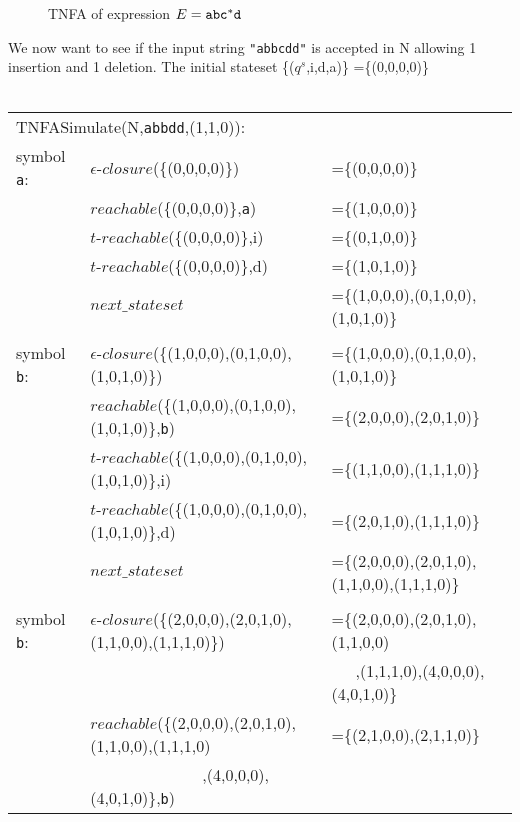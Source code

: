 \begin{myex}
\begin{figure}[h!]
\begin{center}
\end{center}
\caption{TNFA of expression $E = {\tt abc}^*{\tt d}$}
\label{tnfa:simsuc}
\end{figure}
We now want to see if the input string {\tt "abbcdd"} is accepted in N allowing 1 insertion and 1 deletion. The initial stateset \{($q^s$,i,d,a)\} =\{(0,0,0,0)\}\\\\
\begin{table}[h!]
\small
\begin{tabular}{l l l}
\multicolumn{2}{l}{TNFASimulate(N,{\tt abbdd},(1,1,0)):}\\
symbol {\tt a}:& $\epsilon$-$closure$(\{(0,0,0,0)\})&=\{(0,0,0,0)\}\\
&$reachable$(\{(0,0,0,0)\},{\tt a})&=\{(1,0,0,0)\}\\
&$t$-$reachable$(\{(0,0,0,0)\},i)&=\{(0,1,0,0)\}\\
&$t$-$reachable$(\{(0,0,0,0)\},d)&=\{(1,0,1,0)\}\\
&$next\_stateset$&=\{(1,0,0,0),(0,1,0,0),(1,0,1,0)\}\\
\\
symbol {\tt b}:& $\epsilon$-$closure$(\{(1,0,0,0),(0,1,0,0),(1,0,1,0)\}) &=\{(1,0,0,0),(0,1,0,0),(1,0,1,0)\}\\
&$reachable$(\{(1,0,0,0),(0,1,0,0),(1,0,1,0)\},{\tt b})&=\{(2,0,0,0),(2,0,1,0)\}\\
&$t$-$reachable$(\{(1,0,0,0),(0,1,0,0),(1,0,1,0)\},i)&=\{(1,1,0,0),(1,1,1,0)\}\\
&$t$-$reachable$(\{(1,0,0,0),(0,1,0,0),(1,0,1,0)\},d)&=\{(2,0,1,0),(1,1,1,0)\}\\
&$next\_stateset$&=\{(2,0,0,0),(2,0,1,0),(1,1,0,0),(1,1,1,0)\}\\
\\ 
symbol {\tt b}:&$\epsilon$-$closure$(\{(2,0,0,0),(2,0,1,0),(1,1,0,0),(1,1,1,0)\})&=\{(2,0,0,0),(2,0,1,0),(1,1,0,0)\\
&&~~~,(1,1,1,0),(4,0,0,0),(4,0,1,0)\}\\
&$reachable$(\{(2,0,0,0),(2,0,1,0),(1,1,0,0),(1,1,1,0)&=\{(2,1,0,0),(2,1,1,0)\}\\
&~~~~~~~~~~~~~~,(4,0,0,0),(4,0,1,0)\},{\tt b})\\


\end{tabular}
\end{table}
\end{myex}

